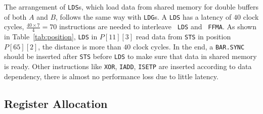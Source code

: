 The arrangement of {\tt LDS}s, which load data from shared memory for double buffers of both $A$ and $B$, follows the 
same way with {\tt LDG}s.
A {\tt LDS} has a latency of $40$ clock cycles, $\frac{40\times 7}{4}=70$ instructions are needed to interleave {\tt 
LDS} and {\tt
FFMA}. As shown in Table~\ref{tab:position}, {\tt LDS} in $P[11][3]$ read data from {\tt STS} in position $P[65][2]$, 
the distance is more than $40$ clock
cycles. In the end, a {\tt BAR.SYNC} should be inserted after {\tt STS} before {\tt LDS} to make sure that data in 
shared memory is ready. Other instructions like {\tt XOR},
{\tt IADD}, {\tt ISETP} are inserted according to data dependency, there is almost no performance loss due to little 
latency.


\subsection{Register Allocation}

